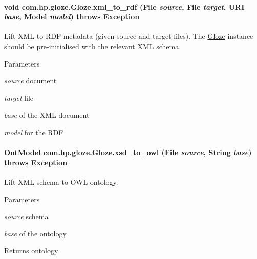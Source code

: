 \hypertarget{classcom_1_1hp_1_1gloze_1_1_gloze_acb73c06c06a33a44cbaa0e846c76fd33}{
\paragraph[{xml\_\-to\_\-rdf}]{\setlength{\rightskip}{0pt plus 5cm}void com.hp.gloze.Gloze.xml\_\-to\_\-rdf (File {\em source}, \/  File {\em target}, \/  URI {\em base}, \/  Model {\em model})  throws Exception }\hfill}
\label{classcom_1_1hp_1_1gloze_1_1_gloze_acb73c06c06a33a44cbaa0e846c76fd33}
Lift XML to RDF metadata (given source and target files). The \hyperlink{classcom_1_1hp_1_1gloze_1_1_gloze}{Gloze} instance should be pre-\/initialised with the relevant XML schema. 
\begin{DoxyParams}{Parameters}
\item[{\em source}]document \item[{\em target}]file \item[{\em base}]of the XML document \item[{\em model}]for the RDF \end{DoxyParams}
\hypertarget{classcom_1_1hp_1_1gloze_1_1_gloze_a9db17584be845f2055b8d8895f0f7f29}{
\paragraph[{xsd\_\-to\_\-owl}]{\setlength{\rightskip}{0pt plus 5cm}OntModel com.hp.gloze.Gloze.xsd\_\-to\_\-owl (File {\em source}, \/  String {\em base})  throws Exception }\hfill}
\label{classcom_1_1hp_1_1gloze_1_1_gloze_a9db17584be845f2055b8d8895f0f7f29}
Lift XML schema to OWL ontology. 
\begin{DoxyParams}{Parameters}
\item[{\em source}]schema \item[{\em base}]of the ontology \end{DoxyParams}
\begin{DoxyReturn}{Returns}
ontology 
\end{DoxyReturn}
